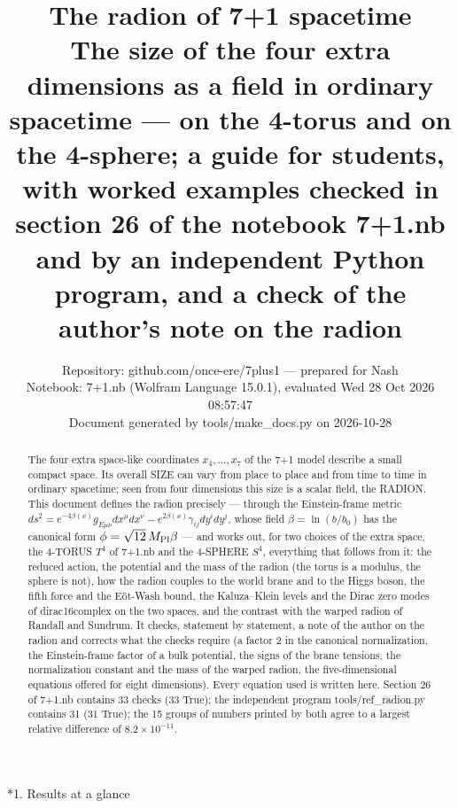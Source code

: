 \documentclass[10pt,a4paper]{article}
\makeatletter
\renewcommand\section{\@startsection{section}{1}{\z@}{-3.5ex \@plus -1ex \@minus -.2ex}{2.3ex \@plus.2ex}{\normalfont\Large\bfseries\raggedright}}
\makeatother
\begin{document}
\title{The radion of 7+1 spacetime\\[0.4em]\large The size of the four extra dimensions as a field in ordinary spacetime — on the 4-torus and on the 4-sphere; a guide for students, with worked examples checked in section 26 of the notebook 7+1.nb and by an independent Python program, and a check of the author’s note on the radion}
\author{Repository: github.com/once-ere/7plus1 — prepared for Nash\\ Notebook: 7+1.nb (Wolfram Language 15.0.1), evaluated Wed 28 Oct 2026 08:57:47\\ Document generated by tools/make\_docs.py on 2026-10-28}
\date{}
\maketitle
\begin{abstract}
The four extra space-like coordinates $x_4,\dots,x_7$ of the 7+1 model describe a small compact space. Its overall SIZE can vary from place to place and from time to time in ordinary spacetime; seen from four dimensions this size is a scalar field, the RADION. This document defines the radion precisely — through the Einstein-frame metric $ds^2=e^{-4\beta(x)}g_{E\mu\nu}dx^\mu dx^\nu-e^{2\beta(x)}\gamma_{ij}dy^idy^j$, whose field $\beta=\ln(b/b_0)$ has the canonical form $\phi=\sqrt{12}\,M_{\rm Pl}\beta$ — and works out, for two choices of the extra space, the 4-TORUS $T^4$ of 7+1.nb and the 4-SPHERE $S^4$, everything that follows from it: the reduced action, the potential and the mass of the radion (the torus is a modulus, the sphere is not), how the radion couples to the world brane and to the Higgs boson, the fifth force and the Eöt-Wash bound, the Kaluza–Klein levels and the Dirac zero modes of dirac16complex on the two spaces, and the contrast with the warped radion of Randall and Sundrum. It checks, statement by statement, a note of the author on the radion and corrects what the checks require (a factor 2 in the canonical normalization, the Einstein-frame factor of a bulk potential, the signs of the brane tensions, the normalization constant and the mass of the warped radion, the five-dimensional equations offered for eight dimensions). Every equation used is written here. Section 26 of 7+1.nb contains 33 checks (33 True); the independent program tools/ref\_radion.py contains 31 (31 True); the 15 groups of numbers printed by both agree to a largest relative difference of $8.2\times10^{-11}$.
\end{abstract}
\tableofcontents
{}\section*{1. Results at a glance}
\end{document}
